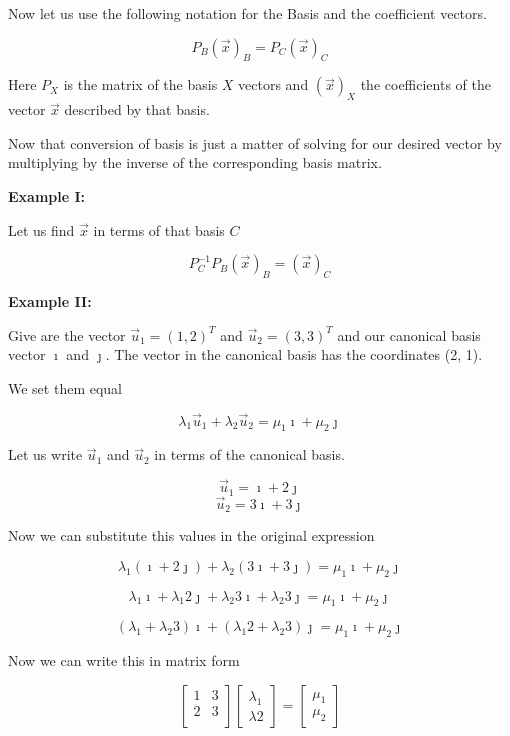 Now let us use the following notation for the Basis and the coefficient vectors.

\[
    P_B {(\vec{x})}_B = P_C {(\vec{x})}_C
\]

Here \(P_{X}\) is the matrix of the basis \(X\) vectors and \({(\vec{x})}_X\) the coefficients of the
vector \(\vec{x}\) described by that basis.

Now that conversion of basis is just a matter of solving for 
our desired vector by multiplying
by the inverse of the corresponding basis matrix.

\textbf{Example I:}

Let us find \(\vec{x}\) in terms of that basis \(C\)

\[
    P_{C}^{-1} P_B {(\vec{x})}_B = {(\vec{x})}_C
\]

\textbf{Example II:}

Give are the vector \(\vec{u}_1 = {(1,2)}^T\) and \(\vec{u}_2 = {(3, 3)}^T\)
and our canonical basis vector \(\imath\) and \(\jmath\). The
vector in the canonical basis has the coordinates (2, 1). 

We set them equal

\[
    \lambda_1 \vec{u}_1 + \lambda_2 \vec{u}_2 = \mu_1 \imath + \mu_2 \jmath 
\]

Let us write \(\vec{u}_1\) and \(\vec{u}_2\) in terms of the canonical basis.

\[
    \vec{u}_1 = \imath + 2 \jmath
\]
\[
    \vec{u}_2 = 3 \imath + 3 \jmath
\]

Now we can substitute this values in the original expression

\[
    \lambda_1 (\imath + 2 \jmath) + \lambda_2 (3 \imath + 3 \jmath) = \mu_1 \imath + \mu_2 \jmath 
\]

\[
    \lambda_1 \imath + \lambda_1 2 \jmath + \lambda_2 3 \imath + \lambda_2 3 \jmath = \mu_1 \imath + \mu_2 \jmath 
\]

\[
    (\lambda_1  +  \lambda_2 3)\imath + (\lambda_1 2  + \lambda_2 3) \jmath = \mu_1 \imath + \mu_2 \jmath 
\]

Now we can write this in matrix form

\[
    \begin{bmatrix}
        1 & 3 \\
        2 & 3 \\
    \end{bmatrix} \begin{bmatrix}
        \lambda_1 \\ \lambda2
    \end{bmatrix} = \begin{bmatrix}
        \mu_1 \\ \mu_2
    \end{bmatrix}
\]

